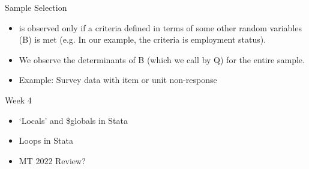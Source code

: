\documentclass{beamer}
\begin{document}
\begin{frame}{Sample Selection}
\begin{itemize}
\item is observed only if a criteria defined in terms of some other random
 variables (B) is met (e.g. In our example, the criteria is employment status).
\item We observe the determinants of B (which we call by Q) for the entire 
sample.
\item Example: Survey data with item or unit non-response
\end{itemize}
\end{frame}


\begin{frame}{Week 4}
\begin{itemize}
\item `Locals' and \$globals in Stata
\item Loops in Stata
\item MT 2022 Review?
\end{itemize}
\end{frame}
\end{document}
